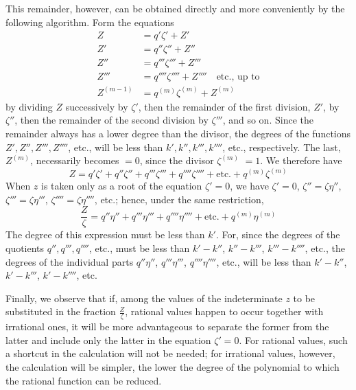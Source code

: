 This remainder, however, can be obtained directly and more conveniently by the following algorithm. Form the equations
\[
\begin{aligned}
Z&=q'\zeta'+Z'\\
Z'&=q''\zeta''+Z''\\
Z''&=q'''\zeta'''+Z'''\\
Z'''&=q''''\zeta''''+Z''''\quad\text{etc., up to}\\
Z^{(m-1)}&=q^{(m)}\zeta^{(m)}+Z^{(m)}
\end{aligned}
\]
by dividing $Z$ successively by $\zeta'$, then the remainder of the first division, $Z'$, by $\zeta''$, then the remainder of the second division by $\zeta'''$, and so on. Since the remainder always has a lower degree than the divisor, the degrees of the functions $Z',Z'',Z''',Z''''$, etc., will be less than $k',k'',k''',k''''$, etc., respectively. The last, $Z^{(m)}$, necessarily becomes $=0$, since the divisor $\zeta^{(m)}$ $=1$. We therefore have
\[
Z=q'\zeta'+q''\zeta''+q'''\zeta'''+q''''\zeta''''+\text{etc.}+q^{(m)}\zeta^{(m)}
\]
When $z$ is taken only as a root of the equation $\zeta'=0$, we have $\zeta'=0$, $\zeta''=\zeta\eta''$, $\zeta'''=\zeta\eta'''$, $\zeta''''=\zeta\eta''''$, etc.; hence, under the same restriction,
\[
\frac{Z}{\zeta}=q''\eta''+q'''\eta'''+q''''\eta''''+\text{etc.}+q^{(m)}\eta^{(m)}
\]
The degree of this expression must be less than $k'$. For, since the degrees of the quotients $q'',q''',q''''$, etc., must be less than $k'-k''$, $k''-k'''$, $k'''-k''''$, etc., the degrees of the individual parts $q''\eta''$, $q'''\eta'''$, $q''''\eta''''$, etc., will be less than $k'-k''$, $k'-k'''$, $k'-k''''$, etc.

Finally, we observe that if, among the values of the indeterminate $z$ to be substituted in the fraction $\frac{Z}{\zeta}$, rational values happen to occur together with irrational ones, it will be more advantageous to separate the former from the latter and include only the latter in the equation $\zeta'=0$. For rational values, such a shortcut in the calculation will not be needed; for irrational values, however, the calculation will be simpler, the lower the degree of the polynomial to which the rational function can be reduced.

